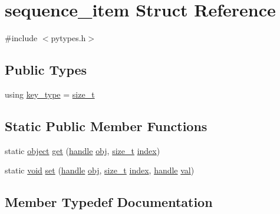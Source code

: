 \hypertarget{structsequence__item}{}\section{sequence\+\_\+item Struct Reference}
\label{structsequence__item}


{\ttfamily \#include $<$pytypes.\+h$>$}

\subsection*{Public Types}
\begin{DoxyCompactItemize}
\item 
using \mbox{\hyperlink{structsequence__item_a87cb414345251dca7dc372dfac88bdc4}{key\+\_\+type}} = \mbox{\hyperlink{detail_2common_8h_a801d6a451a01953ef8cbae6feb6a3638}{size\+\_\+t}}
\end{DoxyCompactItemize}
\subsection*{Static Public Member Functions}
\begin{DoxyCompactItemize}
\item 
static \mbox{\hyperlink{classobject}{object}} \mbox{\hyperlink{structsequence__item_a1fe9bd4ca1289023d16bdd9184158d2f}{get}} (\mbox{\hyperlink{classhandle}{handle}} \mbox{\hyperlink{_s_d_l__opengl__glext_8h_a0c0d4701a6c89f4f7f0640715d27ab26}{obj}}, \mbox{\hyperlink{detail_2common_8h_a801d6a451a01953ef8cbae6feb6a3638}{size\+\_\+t}} \mbox{\hyperlink{_s_d_l__opengl__glext_8h_a57f14e05b1900f16a2da82ade47d0c6d}{index}})
\item 
static \mbox{\hyperlink{_s_d_l__opengles2__gl2ext_8h_ae5d8fa23ad07c48bb609509eae494c95}{void}} \mbox{\hyperlink{structsequence__item_aee77098b776b17d7d237d5eb750bf735}{set}} (\mbox{\hyperlink{classhandle}{handle}} \mbox{\hyperlink{_s_d_l__opengl__glext_8h_a0c0d4701a6c89f4f7f0640715d27ab26}{obj}}, \mbox{\hyperlink{detail_2common_8h_a801d6a451a01953ef8cbae6feb6a3638}{size\+\_\+t}} \mbox{\hyperlink{_s_d_l__opengl__glext_8h_a57f14e05b1900f16a2da82ade47d0c6d}{index}}, \mbox{\hyperlink{classhandle}{handle}} \mbox{\hyperlink{_s_d_l__opengl__glext_8h_a26942fd2ed566ef553eae82d2c109c8f}{val}})
\end{DoxyCompactItemize}


\subsection{Member Typedef Documentation}
\mbox{\label{structsequence__item_a87cb414345251dca7dc372dfac88bdc4}} 

